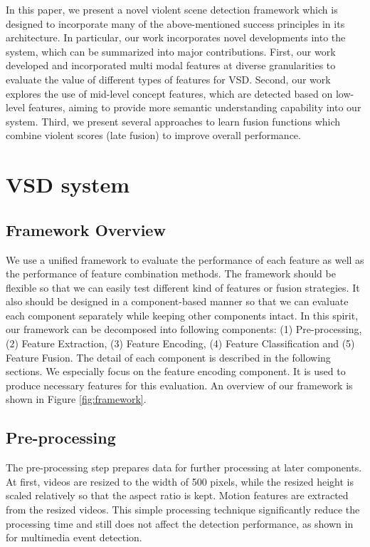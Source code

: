 \documentclass[twocolumn]{bmcart}%
\begin{document}
In this paper, we present a novel violent scene detection framework which is designed to incorporate many of the above-mentioned success principles in its architecture. In particular, our work incorporates novel developments into the system, which can be summarized into major contributions. First, our work developed and incorporated multi modal features at diverse granularities to evaluate the value of different types of features for VSD. Second, our work explores the use of mid-level concept features, which are detected based on low-level features, aiming to provide more semantic understanding capability into our system. Third, we present several approaches to learn fusion functions which combine violent scores (late fusion) to improve overall performance.

\section{VSD system}
\subsection{Framework Overview}
We use a unified framework to evaluate the performance of each feature as well as the performance of feature combination methods. The framework should be flexible so that we can easily test different kind of features or fusion strategies. It also should be designed in a component-based manner so that we can evaluate each component separately while keeping other components intact. In this spirit, our framework can be decomposed into following components: (1) Pre-processing, (2) Feature Extraction, (3) Feature Encoding, (4) Feature Classification and (5) Feature Fusion. The detail of each component is described in the following sections. We especially focus on the feature encoding component. It is used to produce necessary features for this evaluation. An overview of our framework is shown in Figure \ref{fig:framework}.

\subsection{Pre-processing}
The pre-processing step prepares data for further processing at later components. At first, videos are resized to the width of 500 pixels, while the resized height is scaled relatively so that the aspect ratio is kept. Motion features are extracted from the resized videos. This simple processing technique significantly reduce the processing time and still does not affect the detection performance, as shown in \cite{aly2013axes} for multimedia event detection.
\end{document}
